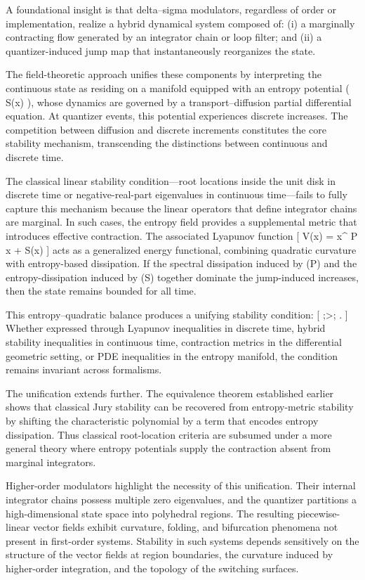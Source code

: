 A foundational insight is that delta–sigma modulators, regardless of order or implementation, realize a hybrid dynamical system composed of:
(i) a marginally contracting flow generated by an integrator chain or loop filter; and
(ii) a quantizer-induced jump map that instantaneously reorganizes the state.

The field-theoretic approach unifies these components by interpreting the continuous state as residing on a manifold equipped with an entropy potential ( S(x) ), whose dynamics are governed by a transport–diffusion partial differential equation. At quantizer events, this potential experiences discrete increases. The competition between diffusion and discrete increments constitutes the core stability mechanism, transcending the distinctions between continuous and discrete time.

The classical linear stability condition—root locations inside the unit disk in discrete time or negative-real-part eigenvalues in continuous time—fails to fully capture this mechanism because the linear operators that define integrator chains are marginal. In such cases, the entropy field provides a supplemental metric that introduces effective contraction. The associated Lyapunov function
[
V(x) = x^{\top} P x + \alpha S(x)
]
acts as a generalized energy functional, combining quadratic curvature with entropy-based dissipation. If the spectral dissipation induced by (P) and the entropy-dissipation induced by (S) together dominate the jump-induced increases, then the state remains bounded for all time.

This entropy–quadratic balance produces a unifying stability condition:
[
 ;>; .
]
Whether expressed through Lyapunov inequalities in discrete time, hybrid stability inequalities in continuous time, contraction metrics in the differential geometric setting, or PDE inequalities in the entropy manifold, the condition remains invariant across formalisms.

The unification extends further. The equivalence theorem established earlier shows that classical Jury stability can be recovered from entropy-metric stability by shifting the characteristic polynomial by a term that encodes entropy dissipation. Thus classical root-location criteria are subsumed under a more general theory where entropy potentials supply the contraction absent from marginal integrators.

Higher-order modulators highlight the necessity of this unification. Their internal integrator chains possess multiple zero eigenvalues, and the quantizer partitions a high-dimensional state space into polyhedral regions. The resulting piecewise-linear vector fields exhibit curvature, folding, and bifurcation phenomena not present in first-order systems. Stability in such systems depends sensitively on the structure of the vector fields at region boundaries, the curvature induced by higher-order integration, and the topology of the switching surfaces.

